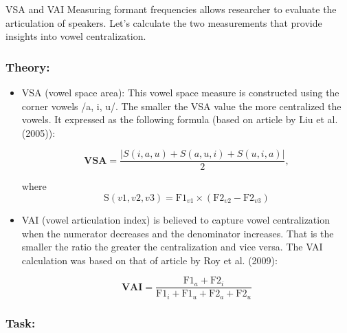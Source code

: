 \documentclass{../labbook}
\begin{document}
\begin{problem}{1}{10}{VSA and VAI}
Measuring formant frequencies allows researcher to evaluate the articulation of speakers. Let's calculate the two measurements that provide insights into vowel centralization. 
\subsubsection*{Theory:}
\begin{itemize}
    \item VSA (vowel space area): This vowel space measure is constructed using the corner vowels /a, i, u/. The smaller the VSA value the more centralized the vowels. It expressed as the following formula (based on article by Liu et al. (2005)): 

\begin{equation}
    \label{VSAeq_easy}
    \mathbf{VSA} = \frac{|S(i, a, u) + S(a, u, i) + S(u, i, a)|}{2}, 
\end{equation}

where
$$\mbox{S}(v1, v2, v3) = \mbox{F1}_{v1} \times (\mbox{F2}_{v2} - \mbox{F2}_{v3})$$
    
    \item VAI (vowel articulation index) is believed to capture vowel centralization when the numerator decreases and the denominator increases. That is the smaller the ratio the greater the centralization and vice versa.  The VAI calculation was based on that of article by Roy et al. (2009): 

\begin{equation}
    \label{VAIeq}
    \mathbf{VAI} = \frac{\mbox{F1}_a +  \mbox{F2}_i}{\mbox{F1}_i + \mbox{F1}_u + \mbox{F2}_a +  \mbox{F2}_u} 
\end{equation}
\end{itemize}

\subsubsection*{Task:}


\end{problem}
\end{document}
